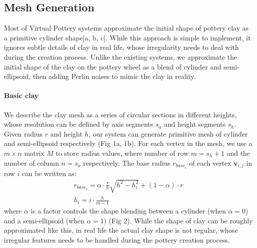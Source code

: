 \subsection{Mesh Generation}
\label{sec:4.1}

Most of Virtual Pottery systems approximate the initial shape of pottery clay as a primitive cylinder shape[a, b, c]. While this approach is simple to implement, it ignores subtle details of clay in real life, whose irregularity needs to deal with during the creation process. Unlike the existing systems, we approximate the initial shape of the clay on the pottery wheel as a blend of cylinder and semi-ellipsoid, then adding Perlin noises to mimic the clay in reality.


\paragraph{Basic clay} We describe the clay mesh as a series of circular sections in different heights, whose resolution can be defined by axis segments $s_{a}$ and height segments $s_{h}$. Given radius $r$ and height $h$, our system can generate primitive mesh of cylinder and semi-ellipsoid respectively (Fig 1a, 1b).
For each vertex in the mesh, we use a $m \times n$ matrix $M$ to store radius values, where number of row $m = s_{h} + 1$ and the number of column $n = s_{a}$ respectively. The base radius $r_{base_{i}}$ of each vertex $\mathbf{v}_{i,j}$ in row $i$ can be written as: 
\begin{equation}
\begin{split}
r_{base_{i}} = \alpha \cdot \frac{r}{h} \sqrt{h^2 -  h_{i}^2} + (1 - \alpha) \cdot r \\
h_{i} = i \cdot \frac{h}{m-1}
\end{split}
\end{equation}
where $\alpha$ is a factor controls the shape blending between a  cylinder (when $\alpha=0$) and a semi-ellipsoid (when $\alpha=1$) (Fig 2).
While the shape of clay can be roughly approximated like this, in real life the actual clay shape is not regular, whose irregular features needs to be handled during the pottery creation process.


